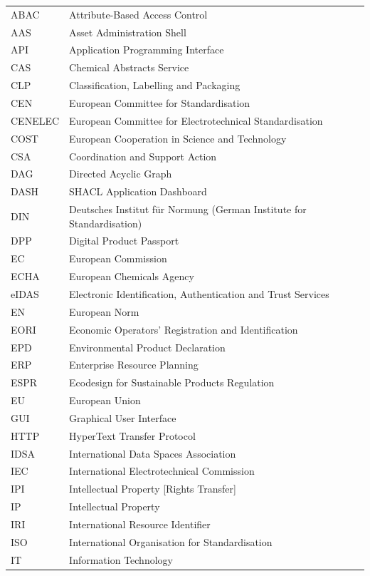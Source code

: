{\begin{longtable}{p{} p{}}
ABAC & Attribute-Based Access Control \\
AAS & Asset Administration Shell \\
API & Application Programming Interface \\
CAS & Chemical Abstracts Service \\
CLP & Classification, Labelling and Packaging \\
CEN & European Committee for Standardisation \\
CENELEC & European Committee for Electrotechnical Standardisation \\
COST & European Cooperation in Science and Technology \\
CSA & Coordination and Support Action \\
DAG & Directed Acyclic Graph \\
DASH & SHACL Application Dashboard \\
DIN & Deutsches Institut für Normung (German Institute for Standardisation) \\
DPP & Digital Product Passport \\
EC & European Commission \\
ECHA & European Chemicals Agency \\
eIDAS & Electronic Identification, Authentication and Trust Services \\
EN & European Norm \\
EORI & Economic Operators' Registration and Identification \\
EPD & Environmental Product Declaration \\
ERP & Enterprise Resource Planning \\
ESPR & Ecodesign for Sustainable Products Regulation \\
EU & European Union \\
GUI & Graphical User Interface \\
HTTP & HyperText Transfer Protocol \\
IDSA & International Data Spaces Association \\
IEC & International Electrotechnical Commission \\
IPI & Intellectual Property [Rights Transfer] \\
IP & Intellectual Property \\
IRI & International Resource Identifier \\
ISO & International Organisation for Standardisation \\
IT & Information Technology \\

\end{longtable}}
